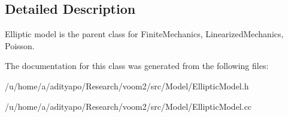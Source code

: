 \subsection{Detailed Description}
Elliptic model is the parent class for FiniteMechanics, LinearizedMechanics, Poisson. 

The documentation for this class was generated from the following files:\begin{DoxyCompactItemize}
\item 
/u/home/a/adityapo/Research/voom2/src/Model/EllipticModel.h\item 
/u/home/a/adityapo/Research/voom2/src/Model/EllipticModel.cc\end{DoxyCompactItemize}
